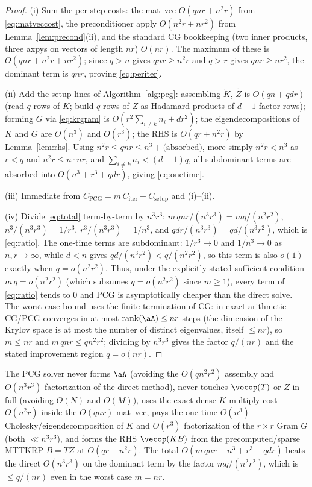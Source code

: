 \begin{proof}
(i) Sum the per-step costs: the mat--vec $O(qnr+n^{2}r)$ from
\eqref{eq:matveccost}, the preconditioner apply $O(n^{2}r+nr^{2})$ from
Lemma~\ref{lem:precond}(ii), and the standard CG bookkeeping (two inner
products, three axpys on vectors of length $nr$) $O(nr)$. The maximum of these
is $O(qnr+n^{2}r+nr^{2})$; since $q>n$ gives $qnr\ge n^{2}r$ and $q>r$ gives
$qnr\ge nr^{2}$, the dominant term is $qnr$, proving \eqref{eq:periter}.

(ii) Add the setup lines of Algorithm~\ref{alg:pcg}: assembling $\tilde K$,
$\tilde Z$ is $O(qn+qdr)$ (read $q$ rows of $K$; build $q$ rows of $Z$ as
Hadamard products of $d-1$ factor rows); forming $G$ via \eqref{eq:krgram} is
$O(r^{2}\sum_{i\neq k}n_i+dr^{2})$; the eigendecompositions of $K$ and $G$ are
$O(n^{3})$ and $O(r^{3})$; the RHS is $O(qr+n^{2}r)$ by Lemma~\ref{lem:rhs}.
Using $n^{2}r\le qnr\le n^3+ \text{(absorbed)}$, more simply $n^2r<n^3$ as $r<q$
and $n^2 r\le n\cdot nr$, and $\sum_{i\neq k}n_i<(d-1)q$, all subdominant terms
are absorbed into $O(n^{3}+r^{3}+qdr)$, giving \eqref{eq:onetime}.

(iii) Immediate from $C_{\mathrm{PCG}}=m\,C_{\mathrm{iter}}+C_{\mathrm{setup}}$
and (i)--(ii).

(iv) Divide \eqref{eq:total} term-by-term by $n^{3}r^{3}$:
$m\,qnr/(n^{3}r^{3})=mq/(n^{2}r^{2})$, $n^{3}/(n^{3}r^{3})=1/r^{3}$,
$r^{3}/(n^{3}r^{3})=1/n^{3}$, and $qdr/(n^{3}r^{3})=qd/(n^{3}r^{2})$, which is
\eqref{eq:ratio}. The one-time terms are subdominant: $1/r^{3}\to0$ and
$1/n^{3}\to0$ as $n,r\to\infty$, while $d<n$ gives
$qd/(n^{3}r^{2})<q/(n^{2}r^{2})$, so this term is also $o(1)$ exactly when
$q=o(n^{2}r^{2})$. Thus, under the explicitly stated sufficient condition
$m\,q=o(n^{2}r^{2})$ (which subsumes $q=o(n^{2}r^{2})$ since $m\ge1$), every
term of \eqref{eq:ratio} tends to $0$ and PCG is asymptotically cheaper than the
direct solve. The worst-case bound uses the finite
termination of CG: in exact arithmetic CG/PCG converges in at most
$\operatorname{rank}(\aA)\le nr$ steps (the dimension of the Krylov space is at
most the number of distinct eigenvalues, itself $\le nr$), so $m\le nr$ and
$m\,qnr\le qn^{2}r^{2}$; dividing by $n^{3}r^{3}$ gives the factor $q/(nr)$ and
the stated improvement region $q=o(nr)$.
\end{proof}

\begin{remark}\label{rem:summary}
The PCG solver never forms $\aA$ (avoiding the $O(qn^{2}r^{2})$ assembly and
$O(n^{3}r^{3})$ factorization of the direct method), never touches $\vecop(T)$
or $Z$ in full (avoiding $O(N)$ and $O(M)$), uses the exact dense $K$-multiply
cost $O(n^{2}r)$ inside the $O(qnr)$ mat--vec, pays the one-time
$O(n^{3})$ Cholesky/eigendecomposition of $K$ and $O(r^{3})$ factorization of
the $r\times r$ Gram $G$ (both $\ll n^{3}r^{3}$), and forms the RHS
$\vecop(KB)$ from the precomputed/sparse MTTKRP $B=TZ$ at $O(qr+n^{2}r)$. The
total $O(m\,qnr+n^{3}+r^{3}+qdr)$ beats the direct $O(n^{3}r^{3})$ on the
dominant term by the factor $mq/(n^{2}r^{2})$, which is $\le q/(nr)$ even in the
worst case $m=nr$.
\end{remark}


